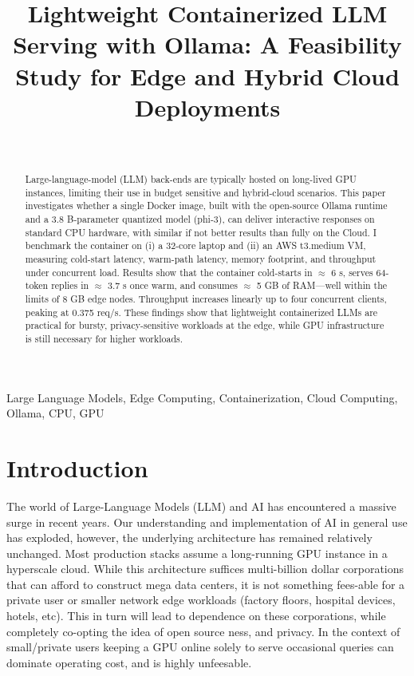 \documentclass[conference]{IEEEtran}
\title{Lightweight Containerized LLM Serving with Ollama: A Feasibility Study for Edge and Hybrid Cloud Deployments}
\author{%
  \IEEEauthorblockN{Kacper Krakowiak}\\%
  \IEEEauthorblockA{South East Technological University\\%
                    Student ID: C00271692\\%
                    \texttt{C00271692@setu.ie}\\%
                    \texttt{kacper.krakowiak2002@gmail.com}}%
}
\begin{document}
\maketitle

\begin{abstract}

Large-language-model (LLM) back-ends are typically hosted on long-lived GPU instances, limiting their use in budget sensitive and hybrid-cloud scenarios. This paper investigates whether a single Docker image, built with the open-source Ollama runtime and a 3.8 B-parameter quantized model (phi-3), can deliver interactive responses on standard CPU hardware, with similar if not better results than fully on the Cloud. I benchmark the container on (i) a 32-core laptop and (ii) an AWS t3.medium VM, measuring cold-start latency, warm-path latency, memory footprint, and throughput under concurrent load. Results show that the container cold-starts in \(\approx\) 6 s, serves 64-token replies in \(\approx\) 3.7 s once warm, and consumes \(\approx\) 5 GB of RAM—well within the limits of 8 GB edge nodes. Throughput increases linearly up to four concurrent clients, peaking at 0.375 req/s. These findings show that lightweight containerized LLMs are practical for bursty, privacy-sensitive workloads at the edge, while GPU infrastructure is still necessary for higher workloads.
\end{abstract}

\begin{IEEEkeywords}
Large Language Models, Edge Computing, Containerization, Cloud Computing, Ollama, CPU, GPU
\end{IEEEkeywords}

\section{Introduction}\label{sec:intro}

The world of Large-Language Models (LLM) and AI has encountered a massive surge in recent years. Our understanding and implementation of AI in general use has exploded, however, the underlying architecture has remained relatively unchanged. Most production stacks assume a long-running GPU instance in a hyperscale cloud. While this architecture suffices multi-billion dollar corporations that can afford to construct mega data centers, it is not something fees-able for a private user or smaller network edge workloads (factory floors, hospital devices, hotels, etc). This in turn will lead to dependence on these corporations, while completely co-opting the idea of open source ness, and privacy. In the context of small/private users keeping a GPU online solely to serve occasional queries can dominate operating cost, and is highly unfeesable.
\end{document}
